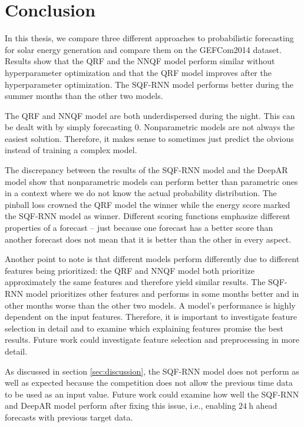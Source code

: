 \section{Conclusion}
\label{sec:conclusion}

In this thesis, we compare three different approaches to probabilistic forecasting 
for solar energy generation and compare them on the GEFCom2014 dataset. 
Results show that the QRF and the NNQF model perform similar without 
hyperparameter optimization and that the QRF model improves after the hyperparameter 
optimization. The SQF-RNN model performs better during the summer months than the other two models. 

The QRF and NNQF model are both underdispersed during the night. This can be dealt with by simply forecasting \(0\). 
Nonparametric models are not always the easiest solution. Therefore, it makes sense to sometimes just predict the obvious 
instead of training a complex model.

The discrepancy between the results of the SQF-RNN model and the DeepAR model show that 
nonparametric models can perform better than parametric ones in a context where we do not know the actual probability distribution. 
The pinball loss crowned the QRF model the winner while the energy score marked the SQF-RNN model as winner. 
Different scoring functions emphasize different properties of a forecast -- just because one forecast has a 
better score than another forecast does not mean that it is better than the other in every aspect.

Another point to note is that different models perform differently due to different features being 
prioritized: the QRF and NNQF model both prioritize approximately the same features and therefore 
yield similar results. The SQF-RNN model prioritizes other features and performs in some months better 
and in other months worse than the other two models. A model's performance is highly dependent on the input features.
Therefore, it is important to investigate feature selection in detail and to examine which explaining features promise the best results. 
Future work could investigate feature selection and preprocessing in more detail. 

As discussed in section \ref{sec:discussion}, the SQF-RNN model does not perform as well as expected 
because the competition does not allow the previous time data to be used as an input value. 
Future work could examine how well the SQF-RNN and DeepAR model perform after fixing this issue, 
i.e., enabling \(\SI{24}{\hour}\) ahead forecasts with previous target data. 

